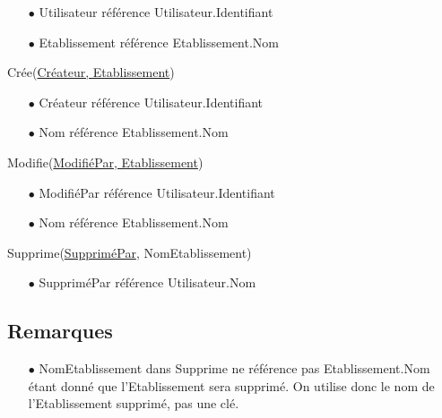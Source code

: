 \documentclass[a4paper, 11pt]{article}
\begin{document}
\begin{itemize}
	\item[$\bullet$] Utilisateur référence Utilisateur.Identifiant
	\item[$\bullet$] Etablissement référence Etablissement.Nom
\end{itemize}
Crée(\underline{Créateur, Etablissement})
\begin{itemize}
	\item[$\bullet$] Créateur référence Utilisateur.Identifiant
	\item[$\bullet$] Nom référence Etablissement.Nom
\end{itemize}
Modifie(\underline{ModifiéPar, Etablissement})
\begin{itemize}
	\item[$\bullet$] ModifiéPar référence Utilisateur.Identifiant
	\item[$\bullet$] Nom référence Etablissement.Nom
\end{itemize}
Supprime({\underline{SuppriméPar}, NomEtablissement})
\begin{itemize}
	\item[$\bullet$] SuppriméPar référence Utilisateur.Nom
\end{itemize}
\subsection*{Remarques}
\begin{itemize}
	\item[$\bullet$] NomEtablissement dans Supprime ne référence pas Etablissement.Nom étant donné que l'Etablissement sera supprimé. On utilise donc le nom de l'Etablissement supprimé, pas une clé.
\end{itemize}
\end{document}
